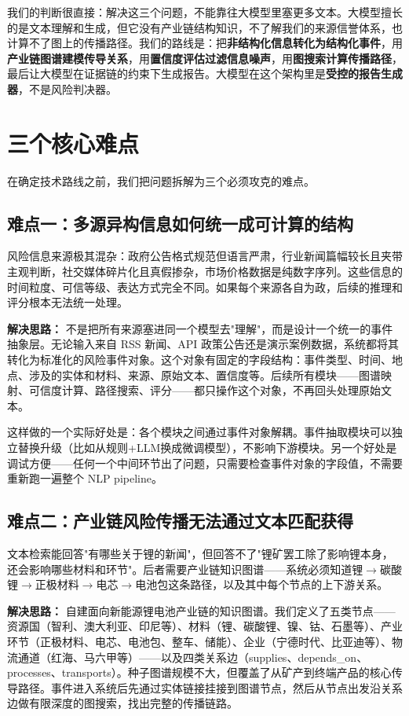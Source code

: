 \documentclass[12pt,a4paper]{ctexart}
\begin{document}
我们的判断很直接：解决这三个问题，不能靠往大模型里塞更多文本。大模型擅长的是文本理解和生成，但它没有产业链结构知识，不了解我们的来源信誉体系，也计算不了图上的传播路径。我们的路线是：把\textbf{非结构化信息转化为结构化事件}，用\textbf{产业链图谱建模传导关系}，用\textbf{置信度评估过滤信息噪声}，用\textbf{图搜索计算传播路径}，最后让大模型在证据链的约束下生成报告。大模型在这个架构里是\textbf{受控的报告生成器}，不是风险判决器。

\section{三个核心难点}

在确定技术路线之前，我们把问题拆解为三个必须攻克的难点。

\subsection{难点一：多源异构信息如何统一成可计算的结构}

风险信息来源极其混杂：政府公告格式规范但语言严肃，行业新闻篇幅较长且夹带主观判断，社交媒体碎片化且真假掺杂，市场价格数据是纯数字序列。这些信息的时间粒度、可信等级、表达方式完全不同。如果每个来源各自为政，后续的推理和评分根本无法统一处理。

\textbf{解决思路：} 不是把所有来源塞进同一个模型去"理解"，而是设计一个统一的事件抽象层。无论输入来自 RSS 新闻、API 政策公告还是演示案例数据，系统都将其转化为标准化的风险事件对象。这个对象有固定的字段结构：事件类型、时间、地点、涉及的实体和材料、来源、原始文本、置信度等。后续所有模块——图谱映射、可信度计算、路径搜索、评分——都只操作这个对象，不再回头处理原始文本。

这样做的一个实际好处是：各个模块之间通过事件对象解耦。事件抽取模块可以独立替换升级（比如从规则+LLM换成微调模型），不影响下游模块。另一个好处是调试方便——任何一个中间环节出了问题，只需要检查事件对象的字段值，不需要重新跑一遍整个 NLP pipeline。

\subsection{难点二：产业链风险传播无法通过文本匹配获得}

文本检索能回答"有哪些关于锂的新闻"，但回答不了"锂矿罢工除了影响锂本身，还会影响哪些材料和环节"。后者需要产业链知识图谱——系统必须知道锂$\to$碳酸锂$\to$正极材料$\to$电芯$\to$电池包这条路径，以及其中每个节点的上下游关系。

\textbf{解决思路：} 自建面向新能源锂电池产业链的知识图谱。我们定义了五类节点——资源国（智利、澳大利亚、印尼等）、材料（锂、碳酸锂、镍、钴、石墨等）、产业环节（正极材料、电芯、电池包、整车、储能）、企业（宁德时代、比亚迪等）、物流通道（红海、马六甲等）——以及四类关系边（supplies、depends\_on、processes、transports）。种子图谱规模不大，但覆盖了从矿产到终端产品的核心传导路径。事件进入系统后先通过实体链接挂接到图谱节点，然后从节点出发沿关系边做有限深度的图搜索，找出完整的传播链路。
\end{document}
